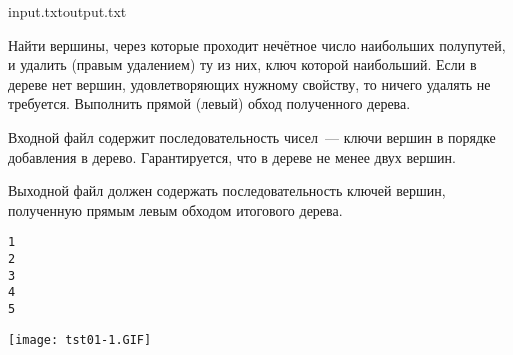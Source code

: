 
\begin{rawproblem}{input.txt}{output.txt}

Найти вершины, через которые проходит нечётное число наибольших полупутей, и
удалить (правым удалением) ту из них, ключ которой наибольший.
Если в дереве нет вершин, удовлетворяющих нужному свойству, то ничего
удалять не требуется. Выполнить прямой (левый) обход полученного дерева.

\InputFile

Входной файл содержит последовательность чисел~--- ключи вершин в порядке добавления в дерево. Гарантируется, что в дереве не менее двух вершин.

\OutputFile

Выходной файл должен содержать последовательность ключей вершин, полученную прямым левым обходом итогового дерева.

\Example

\begin{verbatim}
1
2
3
4
5
\end{verbatim}

\begin{example}%
%
\end{example}%
\begin{center}%
    \texttt{[image: tst01-1.GIF]}%
\end{center}%

\end{rawproblem}


